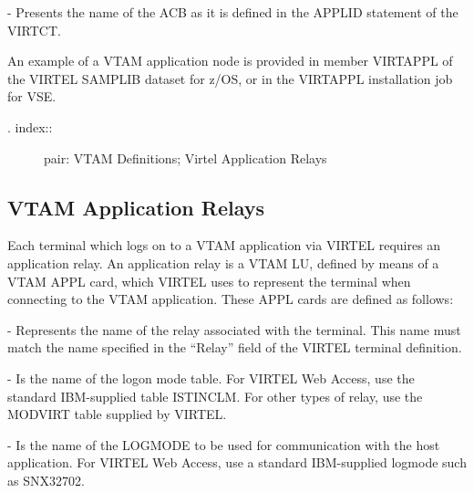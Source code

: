 \documentclass[letterpaper,10pt,english]{sphinxmanual}
\begin{document}
\begin{sphinxVerbatim}[commandchars=\\\{\}]
  
\end{sphinxVerbatim}

 - Presents the name of the ACB as it is defined in the APPLID statement of the VIRTCT.

An example of a VTAM application node is provided in member VIRTAPPL of the VIRTEL SAMPLIB dataset for z/OS, or in the VIRTAPPL installation job for VSE.
\begin{description}
\item[{. index::}] \leavevmode
pair: VTAM Definitions; Virtel Application Relays

\end{description}


\subsection{VTAM Application Relays}
\label{\detokenize{Installation_Guide:vtam-application-relays}}
Each terminal which logs on to a VTAM application via VIRTEL requires an application relay. An application relay is a VTAM LU, defined by means of a VTAM APPL card, which VIRTEL uses to represent the terminal when connecting to the VTAM application. These APPL cards are defined as follows:

\begin{sphinxVerbatim}[commandchars=\\\{\}]
  
\end{sphinxVerbatim}

 - Represents the name of the relay associated with the terminal. This name must match the name specified in the “Relay” field of the VIRTEL terminal definition.

 - Is the name of the logon mode table. For VIRTEL Web Access, use the standard IBM-supplied table ISTINCLM. For other types of relay, use the MODVIRT table supplied by VIRTEL.

 - Is the name of the LOGMODE to be used for communication with the host application. For VIRTEL Web Access, use a standard IBM-supplied logmode such as SNX32702.
\end{document}
